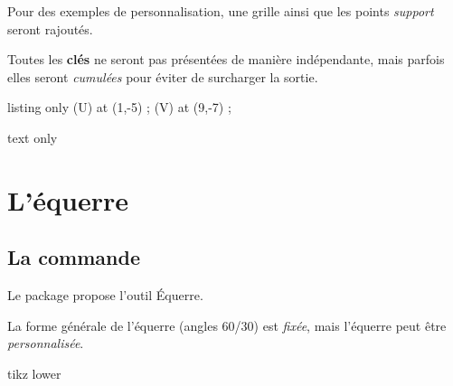 \documentclass[french,a4paper,11pt]{article}
\newcommand\Cle[1]{{\bfseries\sffamily\textlangle #1\textrangle}}
\newcommand\affichegrille[4]{%
	\draw[xstep=1,ystep=1,lightgray] (#1,#3) grid (#2,#4) ;
	\foreach \x in {#1,\inteval{1+#1},...,#2} {\draw[lightgray] (\x,#4)--++(0,3pt) node[font=\scriptsize,above] {$\x$} ;}
	\foreach \y in {#3,\inteval{1+#3},...,#4} {\draw[lightgray] (#1,\y)--++(-3pt,0) node[font=\scriptsize,left] {$\y$} ;}
}
\newcommand\pointsutiles[1]{%
	\foreach \point in {#1} {\draw[thick,fill=red] \point circle[radius=3pt] ;}
}
\begin{document}
\begin{noteblock}
Pour des exemples de personnalisation, une grille ainsi que les points \textit{support} seront rajoutés.

\smallskip

Toutes les \Cle{clés} ne seront pas présentées de manière indépendante, mais parfois elles seront \textit{cumulées} pour éviter de surcharger la sortie.
\end{noteblock}

\begin{PresentationCode}{listing only}
\coordinate (U) at (1,-5) ;
\coordinate (V) at (9,-7) ;
\tkzRegleRepere[Fond,CouleurFond=red]
\tkzRegleRepere[Longueur=8,Rotation=auto/V,Couleur=ForestGreen, Origine=U,Fond,AfficheValeurs=false]
\tkzRegleRepere[Longueur=18,Echelle=0.5,Couleur=blue,Rotation=20, Origine={(3,3.25)},Retourne]
\end{PresentationCode}

\begin{PresentationCode}{text only}
\end{PresentationCode}

\pagebreak

\section{L'équerre}

\subsection{La commande}

\begin{cautionblock}
Le package propose l'outil \textsf{Équerre}.

La forme générale de l'équerre (angles 60/30) est \textit{fixée}, mais l'équerre peut être \textit{personnalisée}.
\end{cautionblock}

\begin{PresentationCode}{tikz lower}
\tkzEquerre
\end{PresentationCode}
\end{document}
